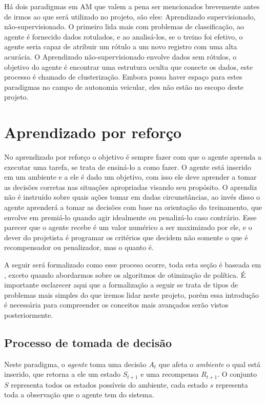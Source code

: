 Há dois paradigmas em AM que valem a pena ser mencionados brevemente antes de irmos ao que será utilizado no projeto, são eles: Aprendizado supervisionado, não-supervisionado. O primeiro lida mais com problemas de classificação, ao agente é fornecido dados rotulados, e ao analisá-los, se o treino foi efetivo, o agente seria capaz de atribuir um rótulo a um novo registro com uma alta acurácia. O Aprendizado não-supervisionado envolve dados sem rótulos, o objetivo do agente é encontrar uma estrutura oculta que conecte os dados, este processo é chamado de clusterização. Embora possa haver espaço para estes paradigmas no campo de autonomia veicular, eles não estão no escopo deste projeto.

\section{Aprendizado por reforço}
No aprendizado por reforço o objetivo é sempre fazer com que o agente aprenda a executar uma tarefa, se trata de ensiná-lo a como fazer. O agente está inserido em um ambiente e a ele é dado um objetivo, com isso ele deve aprender a tomar as decisões corretas nas situações apropriadas visando seu propósito. O aprendiz não é instruído sobre quais ações tomar em dadas circunstâncias, ao invés disso o agente aprenderá a tomar as decisões com base na orientação do treinamento, que envolve em premiá-lo quando agir idealmente ou penalizá-lo caso contrário. Esse parecer que o agente recebe é um valor numérico a ser maximizado por ele, e o dever do projetista é programar os critérios que decidem não somente o que é recompensador ou penalizador, mas o quanto é.

A seguir será formalizado como esse proceso ocorre, toda esta seção é baseada em , exceto quando abordarmos sobre os algoritmos de otimização de política. É importante esclarecer aqui que a formalização a seguir se trata de tipos de problemas mais simples do que iremos lidar neste projeto, porém essa introdução é necessária para compreender os conceitos mais avançados serão vistos posteriormente.

\subsection{Processo de tomada de decisão} \label{mdp-section}
Neste paradigma, o \textit{agente} toma uma decisão $A_t$ que afeta o \textit{ambiente} o qual está inserido, que retorna a ele um estado $S_{t+1}$ e uma recompensa $R_{t+1}$. O conjunto $S$ representa todos os estados possíveis do ambiente, cada estado $s$ representa toda a observação que o agente tem do sistema. 

